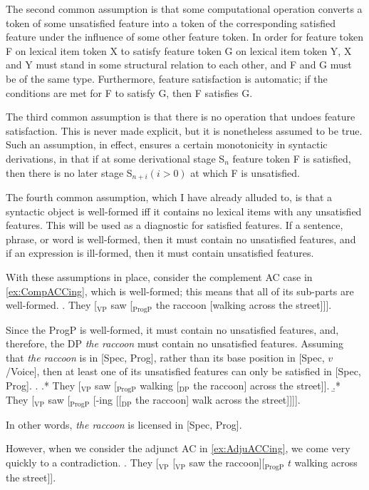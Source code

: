 \documentclass[MilwayThesis]{subfiles}
\begin{document}
The second common assumption is that some computational operation converts a token of some unsatisfied feature into a token of the corresponding satisfied feature under the influence of some other feature token.
In order for feature token F on lexical item token X to satisfy feature token G on lexical item token Y, X and Y must stand in some structural relation to each other, and F and G must be of the same type.
Furthermore, feature satisfaction is automatic; if the conditions are met for F to satisfy G, then F satisfies G.

The third common assumption is that there is no operation that undoes feature satisfaction.
This is never made explicit, but it is nonetheless assumed to be true.
Such an assumption, in effect, ensures a certain monotonicity in syntactic derivations, in that if at some derivational stage S$_n$ feature token F is satisfied, then there is no later stage S$_{n+i} (i > 0)$ at which F is unsatisfied.

The fourth common assumption, which I have already alluded to, is that a syntactic object is well-formed iff it contains no lexical items with any unsatisfied features.
This will be used as a diagnostic for satisfied features.
If a sentence, phrase, or word is well-formed, then it must contain no unsatisfied features, and if an expression is ill-formed, then it must contain unsatisfied features.

With these assumptions in place, consider the complement AC case in \cref{ex:CompACCing}, which is well-formed; this means that all of its sub-parts are well-formed.
\ex. They [$_\text{VP}$ saw [$_\text{ProgP}$ the raccoon [walking across the street]]].\label{ex:CompACCing}

Since the ProgP is well-formed, it must contain no unsatisfied features, and, therefore, the DP \textit{the raccoon} must contain no unsatisfied features.
Assuming that \textit{the raccoon} is in [Spec, Prog], rather than its base position in [Spec, $v$/Voice], then at least one of its unsatisfied features can only be satisfied in [Spec, Prog]. 
\ex.
\a.* They [$_\text{VP}$ saw [$_\text{ProgP}$ walking [$_\text{DP}$ the raccoon] across the street]].
\b.* They [$_\text{VP}$ saw [$_\text{ProgP}$ [-ing [[$_\text{DP}$ the raccoon] walk across the street]]]].

In other words, \textit{the raccoon} is licensed in [Spec, Prog].

However, when we consider the adjunct AC in \cref{ex:AdjuACCing}, we come very quickly to a contradiction.
\ex. They [$_\text{VP}$ [$_\text{VP}$ saw the raccoon][$_\text{ProgP}$ $t$ walking across the street]].\label{ex:AdjuACCing}
\end{document}

